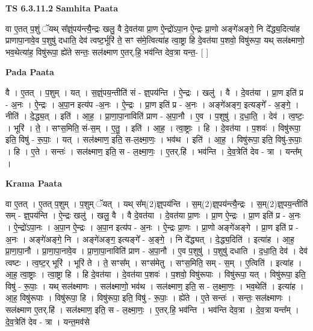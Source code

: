 \documentclass[17pt]{extarticle}
\begin{document}
\textbf{TS 6.3.11.2 } \newline
\textbf{Samhita Paata} \newline

वा ए॒तत् प॒शुं ॅयथ् स᳚ज्ञ्ं॒पय॑न्त्यै॒न्द्रः खलु॒ वै दे॒वत॑या प्रा॒ण ऐ॒न्द्रो॑ऽपा॒न ऐ॒न्द्रः प्रा॒णो अङ्गे॑अङ्गे॒ नि दे᳚द्ध्य॒दित्या॑ह प्राणापा॒नावे॒व प॒शुषु॑ दधाति॒ देव॑ त्वष्ट॒र्भूरि॑ ते॒ सꣳ स॑मे॒त्वित्या॑ह त्वा॒ष्ट्रा हि दे॒वत॑या प॒शवो॒ विषु॑रूपा॒ यथ् सल॑क्ष्माणो॒ भव॒थेत्या॑ह॒ विषु॑रूपा॒ ह्ये॑ते सन्तः॒ सल॑क्ष्माण ए॒तर्.हि॒ भव॑न्ति देव॒त्रा यन्त॒- [  ] \newline

\textbf{Pada Paata} \newline

वै । ए॒तत् । प॒शुम् । यत् । स॒ज्ञ्ं॒पय॒न्तीति॑ सं - ज्ञ्॒पय॑न्ति । ऐ॒न्द्रः । खलु॑ । वै । दे॒वत॑या । प्रा॒ण इति॑ प्र - अ॒नः । ऐ॒न्द्रः । अ॒पा॒न इत्य॑प -अ॒नः । ऐ॒न्द्रः । प्रा॒ण इति॑ प्र - अ॒नः । अङ्गे॑अङ्ग॒ इत्यङ्गे᳚ - अ॒ङ्गे॒ । नीति॑ । दे॒द्ध्य॒त् । इति॑ । आ॒ह॒ । प्रा॒णा॒पा॒नाविति॑ प्राण - अ॒पा॒नौ । ए॒व । प॒शुषु॑ । द॒धा॒ति॒ । देव॑ । त्व॒ष्टः॒ । भूरि॑ । ते॒ । सꣳस॒मिति॒ सं-स॒म् । ए॒तु॒ । इति॑ । आ॒ह॒ । त्वा॒ष्ट्राः । हि । दे॒वत॑या । प॒शवः॑ । विषु॑रूपा॒ इति॒ विषु॑ - रू॒पाः॒ । यत् । सल॑क्ष्माण॒ इति॒ स-ल॒क्ष्मा॒णः॒ । भव॑थ । इति॑ । आ॒ह॒ । विषु॑रूपा॒ इति॒ विषु॑-रू॒पाः॒ । हि । ए॒ते । सन्तः॑ । सल॑क्ष्माण॒ इति॒ स - ल॒क्ष्मा॒णः॒ । ए॒तर्.हि॑ । भव॑न्ति । दे॒व॒त्रेति॑ देव - त्रा । यन्त᳚म् ।  \newline


\textbf{Krama Paata} \newline

वा ए॒तत् । ए॒तत् प॒शुम् । प॒शुम् ॅयत् । यथ् स᳚म्(2)ज्ञ्॒पय॑न्ति । स॒म्(2)ज्ञ्॒पय॑न्त्यै॒न्द्रः । स॒म्(2)ज्ञ्॒पय॒न्तीति॑ सम् - ज्ञ्॒पय॑न्ति । ऐ॒न्द्रः खलु॑ । खलु॒ वै । वै दे॒वत॑या । दे॒वत॑या प्रा॒णः । प्रा॒ण ऐ॒न्द्रः । प्रा॒ण इति॑ प्र - अ॒नः । ऐ॒न्द्रो॑ऽपा॒नः । अ॒पा॒न ऐ॒न्द्रः । अ॒पा॒न इत्य॑प - अ॒नः । ऐ॒न्द्रः प्रा॒णः । प्रा॒णो अङ्‍गे॑अङ्‍गे । प्रा॒ण इति॑ प्र - अ॒नः । अङ्‍गे॑अङ्‍गे॒ नि । अङ्‍गे॑अङ्‍ग॒ इत्यङ्‍गे᳚ - अ॒ङ्‍गे॒ । नि दे᳚द्ध्यत् । दे॒द्ध्य॒दिति॑ । इत्या॑ह । आ॒ह॒ प्रा॒णा॒पा॒नौ । प्रा॒णा॒पा॒नावे॒व । प्रा॒णा॒पा॒नाविति॑ प्राण - अ॒पा॒नौ । ए॒व प॒शुषु॑ । प॒शुषु॑ दधाति । द॒धा॒ति॒ देव॑ । देव॑ त्वष्टः । त्व॒ष्ट॒र् भूरि॑ । भूरि॑ ते । ते॒ सꣳस᳚म् । सꣳस॑मेतु । सꣳस॒मिति॒ सम् - स॒म् । ए॒त्विति॑ । इत्या॑ह । आ॒ह॒ त्वा॒ष्ट्राः । त्वा॒ष्ट्रा हि । हि दे॒वत॑या । दे॒वत॑या प॒शवः॑ । प॒शवो॒ विषु॑रूपाः । विषु॑रूपा॒ यत् । विषु॑रूपा॒ इति॒ विषु॑ - रू॒पाः॒ । यथ् सल॑क्ष्माणः । सल॑क्ष्माणो॒ भव॑थ । सल॑क्ष्माण॒ इति॒ स - ल॒क्ष्मा॒णः॒ । भव॒थेति॑ । इत्या॑ह । आ॒ह॒ विषु॑रूपाः । विषु॑रूपा॒ हि । विषु॑रूपा॒ इति॒ विषु॑ - रू॒पाः॒ । ह्ये॑ते । ए॒ते सन्तः॑ । सन्तः॒ सल॑क्ष्माणः । सल॑क्ष्माण ए॒तर्.हि॑ । सल॑क्ष्माण॒ इति॒ स - ल॒क्ष्मा॒णः॒ । ए॒तर्.हि॒ भव॑न्ति । भव॑न्ति देव॒त्रा । दे॒व॒त्रा यन्त᳚म् । दे॒व॒त्रेति॑ देव - त्रा । यन्त॒मव॑से \newline
\end{document}
